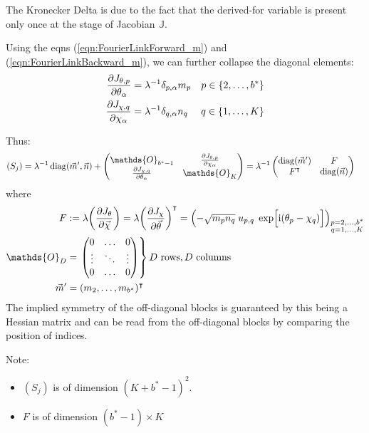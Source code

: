 \documentclass[
	english,
	a4paper,
	fontsize=10pt,
	parskip=half,
	titlepage=true,
	DIV=12,
	final
]{scrreprt}
\newcommand*{\transp}{\ensuremath{^\intercal}}
\newcommand*{\iunit}{\ensuremath{\mathrm{i}}}
\DeclareMathOperator{\diag}{diag}
\begin{document}
The Kronecker Delta is due to the fact that the derived-for variable is present only once at the stage of Jacobian $\mathbb{J}$.

Using the eqns (\ref{eqn:FourierLinkForward_m}) and (\ref{eqn:FourierLinkBackward_m}), we can further collapse the diagonal elements:
\begin{align}
	\pdv{J_{\theta, p}}{\theta_{\alpha}}
&=
	\lambda^{-1}
	\delta_{p,\alpha}
	m_p
&
	p \in \{2, \ldots, b^*\}
\\
	\pdv{J_{\chi, q}}{\chi_{\alpha}}
&=
	\lambda^{-1}
	\delta_{q,\alpha}
	n_q
&
	q \in \{1, \ldots, K\}
\end{align}

Thus:
\begin{align}
	(S_j)
&=
	\lambda^{-1}
	\diag(\vec{m}', \vec{n})
	+
	\begin{pmatrix}
		\mathds{O}_{b^*-1} & 
		\pdv{J_{\theta, p}}{\chi_{\alpha}}
		\\
		\pdv{J_{\chi, q}}{\theta_{\alpha}} &
		\mathds{O}_{K}
	\end{pmatrix}
=
	\lambda^{-1}
	\begin{pmatrix}
		\diag(\vec{m}') & F 			\\
		F\transp & \diag(\vec{n})
	\end{pmatrix}
\end{align}
where
\begin{align}
	F
&:=
	\lambda \qty( \pdv{J_{\theta}}{\vec{\chi}} ) 
	= \lambda \qty( \pdv{J_{\chi}}{\vec{\theta}} )\transp
	= \qty( -\sqrt{m_p n_q} \; u_{p,q} \; \exp[\Big. \iunit(\theta_p - \chi_q)] )_{
		\substack{p = 2, \ldots, b^* \\ q = 1, \ldots, K}
	}
\\
	\mathds{O}_{D}
&=	
	\left.
	\mqty(
		0		& \ldots		& 0 \\
		\vdots	& \ddots 	& \vdots \\
		0		& \ldots		& 0
	)
	\right\} D \text{ rows}, D \text{ columns}
\\
	\vec{m}'
&=
	(m_2, \ldots, m_{b^*})\transp
\end{align}
The implied symmetry of the off-diagonal blocks is guaranteed by this being a Hessian matrix and can be read from the off-diagonal blocks by comparing the position of indices.

Note:
\begin{itemize}
\item $(S_j)$ is of dimension $(K + b^* - 1)^{2}$.
\item $F$ is of dimension $(b^* - 1) \times K$
\end{itemize}
\end{document}
